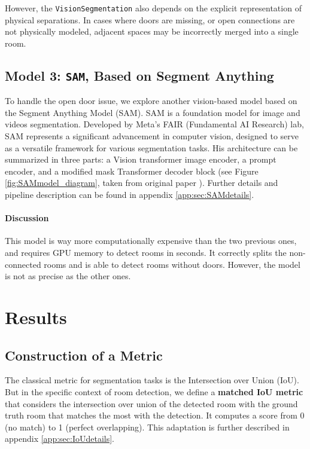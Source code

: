 \documentclass[11pt]{article}
\begin{document}
However, the \texttt{VisionSegmentation} also depends on the explicit representation of physical separations. 
In cases where doors are missing, or open connections are not physically modeled, 
adjacent spaces may be incorrectly merged into a single room.


\subsection{Model 3: \texttt{SAM}, Based on Segment Anything}
To handle the open door issue, we explore another vision-based model 
based on the Segment Anything Model 
(SAM)\cite{kirillov2023segment}. SAM is a foundation model for image and videos segmentation. Developed by 
Meta's FAIR (Fundamental AI Research) lab, SAM represents a significant advancement 
in computer vision, designed to serve as a versatile framework for various 
segmentation tasks. His architecture can be summarized in three parts: a Vision 
transformer image encoder, a prompt encoder, and a modified mask Transformer decoder
 block (see Figure \ref{fig:SAMmodel_diagram}, taken from original paper \cite{kirillov2023segment}).
 Further details and pipeline description 
 can be found in appendix \ref{app:sec:SAMdetails}. 

\paragraph{Discussion}
This model is way more computationally expensive than the two previous ones, 
and requires GPU memory to detect rooms in seconds. It correctly splits
the non-connected rooms and is able to detect rooms without doors.
However, the model is not as precise as the other ones.



\section{Results}

\subsection{Construction of a Metric}
\label{sec:metric}
The classical metric for segmentation tasks is the Intersection over Union (IoU).
But in the specific context of room detection, we define a \textbf{matched IoU
metric} that considers the intersection over union of the detected room with the
ground truth room that matches the most with the detection. It computes a score from 0 (no match) to 1 (perfect 
overlapping). 
This adaptation is further described in appendix 
\ref{app:sec:IoUdetails}. 
\end{document}
